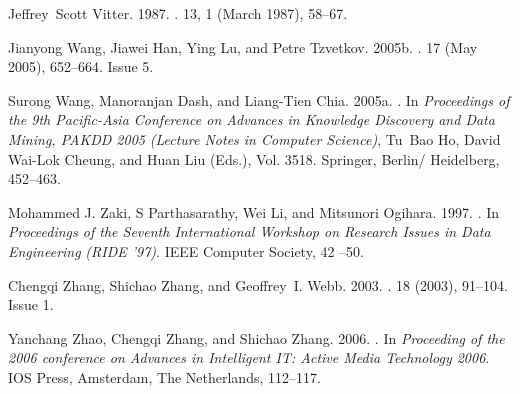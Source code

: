 \begin{thebibliography}{00}
{Jeffrey~Scott Vitter}. 1987.
\newblock {}.
 {13}, 1 (March 1987), 58--67.


{Jianyong Wang}, {Jiawei Han}, {Ying Lu}, {and} {Petre Tzvetkov}. 2005b.
\newblock {}.
  {17} (May 2005),
  652--664.
\newblock
Issue 5.


{Surong Wang}, {Manoranjan Dash}, {and} {Liang-Tien Chia}. 2005a.
\newblock {}. In
  {\em Proceedings of the 9th Pacific-Asia Conference on Advances in Knowledge
  Discovery and Data Mining, PAKDD 2005} {\em (Lecture Notes in Computer
  Science)}, {Tu~Bao Ho}, {David Wai-Lok Cheung}, {and} {Huan Liu} (Eds.), Vol.
  3518. Springer, Berlin/ Heidelberg, 452--463.


{Mohammed J. Zaki}, {S Parthasarathy}, {Wei Li}, {and} {Mitsunori Ogihara}. 1997.
\newblock {}. In {\em Proceedings of the Seventh International Workshop
  on Research Issues in Data Engineering} {\em (RIDE '97)}. IEEE Computer
  Society, 42 --50.


{Chengqi Zhang}, {Shichao Zhang}, {and} {Geoffrey~I. Webb}. 2003.
\newblock {}.
  {18} (2003), 91--104.
\newblock
Issue 1.


{Yanchang Zhao}, {Chengqi Zhang}, {and} {Shichao Zhang}. 2006.
\newblock {}. In
  {\em Proceeding of the 2006 conference on Advances in Intelligent IT: Active
  Media Technology 2006}. IOS Press, Amsterdam, The Netherlands, 112--117.


\end{thebibliography}
\fi
